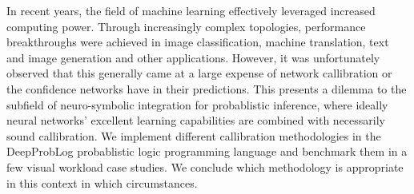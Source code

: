 In recent years, the field of machine learning effectively leveraged increased computing power. Through increasingly complex topologies, performance breakthroughs were achieved in image classification, machine translation, text and image generation and other applications. However, it was unfortunately observed that this generally came at a large expense of network callibration or the confidence networks have in their predictions. This presents a dilemma to the subfield of neuro-symbolic integration for probablistic inference, where ideally neural networks' excellent learning capabilities are combined with necessarily sound callibration. We implement different callibration methodologies in the DeepProbLog probablistic logic programming language and benchmark them in a few visual workload case studies. We conclude which methodology is appropriate in this context in which circumstances.